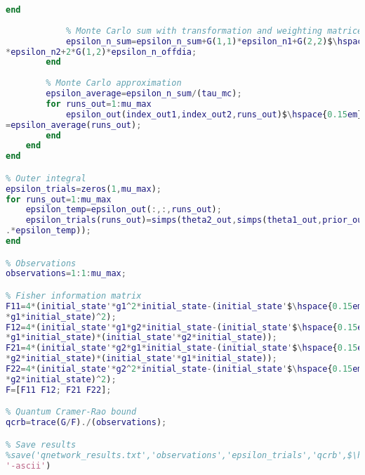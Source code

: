 \begin{lstlisting}[language=Matlab, mathescape=true]
            end
            
            % Monte Carlo sum with transformation and weighting matrices
            epsilon_n_sum=epsilon_n_sum+G(1,1)*epsilon_n1+G(2,2)$\hspace{0.15em}\swarrow$
*epsilon_n2+2*G(1,2)*epsilon_n_offdia;
        end
                  
        % Monte Carlo approximation
        epsilon_average=epsilon_n_sum/(tau_mc);
        for runs_out=1:mu_max
            epsilon_out(index_out1,index_out2,runs_out)$\hspace{0.15em}\swarrow$
=epsilon_average(runs_out);
        end
    end
end

% Outer integral
epsilon_trials=zeros(1,mu_max);
for runs_out=1:mu_max
    epsilon_temp=epsilon_out(:,:,runs_out);
    epsilon_trials(runs_out)=simps(theta2_out,simps(theta1_out,prior_out$\hspace{0.15em}\swarrow$
.*epsilon_temp));
end

% Observations
observations=1:1:mu_max;

% Fisher information matrix
F11=4*(initial_state'*g1^2*initial_state-(initial_state'$\hspace{0.15em}\swarrow$
*g1*initial_state)^2);
F12=4*(initial_state'*g1*g2*initial_state-(initial_state'$\hspace{0.15em}\swarrow$
*g1*initial_state)*(initial_state'*g2*initial_state));
F21=4*(initial_state'*g2*g1*initial_state-(initial_state'$\hspace{0.15em}\swarrow$
*g2*initial_state)*(initial_state'*g1*initial_state));
F22=4*(initial_state'*g2^2*initial_state-(initial_state'$\hspace{0.15em}\swarrow$
*g2*initial_state)^2);
F=[F11 F12; F21 F22];

% Quantum Cramer-Rao bound
qcrb=trace(G/F)./(observations);

% Save results
%save('qnetwork_results.txt','observations','epsilon_trials','qcrb',$\hspace{0.15em}\swarrow$
'-ascii')
\end{lstlisting}